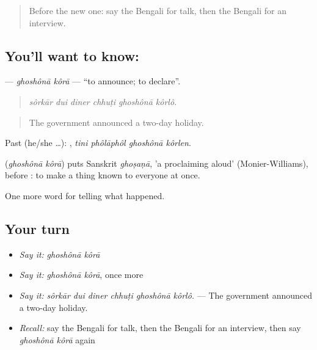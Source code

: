 \label{lesson:BN-C297-ghoshona-kora}



\begin{quote}
Before the new one: say the Bengali for talk, then the Bengali for an interview.
\end{quote}

\subsection*{You'll want to know:  }
\textbf{ } — \emph{ghoshônā kôrā} — \textquotedblleft{}to announce; to declare\textquotedblright{}.

\begin{quote}
     
\end{quote}

\begin{quote}
\emph{sôrkār dui diner chhuṭi ghoshônā kôrlô.}
\end{quote}

\begin{quote}
The government announced a two-day holiday.
\end{quote}

Past (he/she …):    , \emph{tini phôlāphôl ghoshônā kôrlen}.

\begin{cousinweb}
\textbf{ } (\emph{ghoshônā kôrā}) puts Sanskrit \emph{ghoṣaṇā}, 'a proclaiming aloud' (Monier-Williams), before : to make a thing known to everyone at once.
\end{cousinweb}

\begin{grammarlens}[title={What you've built}]
One more word for telling what happened.
\end{grammarlens}

\subsection*{Your turn}
\begin{itemize}
\raggedright
  \item \emph{Say it:} \emph{ghoshônā kôrā}
  \item \emph{Say it:} \emph{ghoshônā kôrā}, once more
  \item \emph{Say it:} \emph{sôrkār dui diner chhuṭi ghoshônā kôrlô.} — The government announced a two-day holiday.
  \item \emph{Recall:} say the Bengali for talk, then the Bengali for an interview, then say \emph{ghoshônā kôrā} again
\end{itemize}

